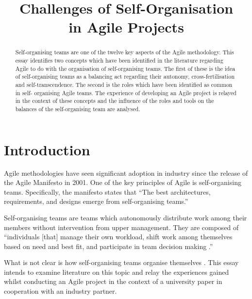 \documentclass[conference]{IEEEtran}
\begin{document}
\title{Challenges of Self-Organisation\\in Agile Projects}


\author{
}


\maketitle


\begin{abstract}

Self-organising teams are one of the twelve key aspects of the Agile
methodology. This essay identifies two concepts which have been identified in
the literature regarding Agile to do with the organisation of self-organising
teams. The first of these is the idea of self-organising teams as a balancing
act regarding their autonomy, cross-fertilisation and self-transcendence. The
second is the roles which have been identified as common in self- organising
Agile teams. The experience of developing an Agile project is relayed in the
context of these concepts and the influence of the roles and tools on the
balances of the self-organising team are analysed.


\end{abstract}


\section{Introduction}

Agile methodologies have seen significant adoption in industry since the release
of the Agile Manifesto \cite{agileadoption} in 2001. One of the key principles
of Agile is self-organising teams. Specifically, the manifesto states that ``The
best architectures, requirements, and designs emerge from self-organising
teams.'' \cite{fowler2001agile}

Self-organising teams are teams which autonomously distribute work among their
members without intervention from upper management. They are composed of
``individuals [that] manage their own workload, shift work among themselves
based on need and best fit, and participate in team decision
making \cite{highsmith2009agile}.''

What is not clear is how self-organising teams organise themselves
\cite{hoda2010organizing}. This essay intends to examine literature on this
topic and relay the experiences gained whilst conducting an Agile project in the
context of a university paper in cooperation with an industry partner.
\end{document}
